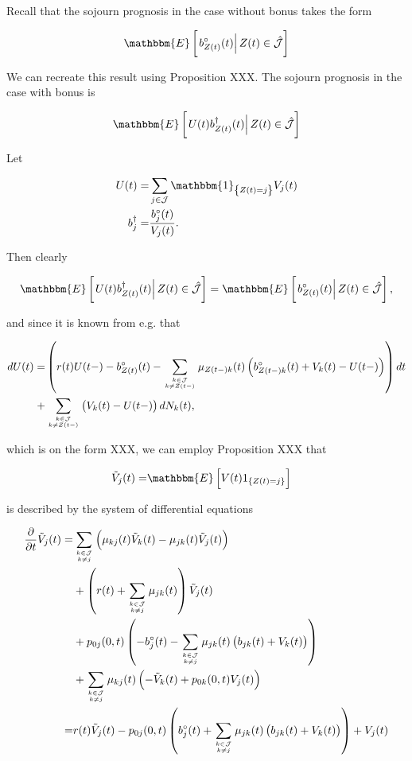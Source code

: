 \documentclass{book}
\newcommand{\1}[1]{\mathbbm{1}_{\left\lbrace #1 \right\rbrace}}
\newcommand{\expec}[1][def]{\mathbbm{E} \left[ #1 \right]}
\newcommand{\econd}[2][def]{\mathbbm{E} \left[ \left. #1 \right| #2 \right]}
\theoremstyle{break}
\theoremstyle{remark}
\newenvironment{remark}
  {\pushQED{\qed}\renewcommand{\qedsymbol}{\scalebox{1.4}{$\circ$}}\remarkx}
  {\popQED\endremarkx}
\numberwithin{equation}{section}
\begin{document}
\begin{remark}
	Recall that the sojourn prognosis in the case without bonus takes the form
	
	
	
	\begin{align}
	\econd[ b_{Z(t)}^\circ(t)]{Z(t) \in \hat{\mathcal{J}}}
	\end{align}
	
	We can recreate this result using Proposition XXX. The sojourn prognosis in the case with bonus is
	
	\begin{align}
	\econd[ U(t) b_{Z(t)}^\dagger(t)]{Z(t) \in \hat{\mathcal{J}}}
	\end{align}
	
	Let
	
	\begin{align*}
	U(t) =&  \sum_{j \in \mathcal{J}} \1{Z(t)=j} V_j(t) \\
	b_j^\dagger =& \frac{b_j^\circ(t)}{V_j(t)}.
	\end{align*}
	
	Then clearly
	
	\begin{align}
	\econd[ U(t) b_{Z(t)}^\dagger(t)]{Z(t) \in \hat{\mathcal{J}}} = \econd[ b_{Z(t)}^\circ(t)]{Z(t) \in \hat{\mathcal{J}}},
	\end{align}
	
	and since it is known from e.g. \cite{Liv2} that
	
	\begin{align*}
	dU(t) =& \left( r(t)U(t-) - b_{Z(t)}^\circ(t) - \sum_{k \in \mathcal{J} \atop k \neq Z(t-)} \mu_{Z(t-)k}(t) \left( b_{Z(t-)k}^\circ(t) + V_k(t) - U(t-) \right) \right) dt \\
	+& \sum_{k \in \mathcal{J} \atop k \neq Z(t-)} \left(V_k(t) - U(t-) \right) dN_k(t),
	\end{align*}
	
	which is on the form XXX, we can employ Proposition XXX that
	
	\begin{align*}
	\tilde{V}_j(t) =& \expec[ V(t) 1_{\{Z(t)=j\}} ]
	\end{align*}
	
	is described by the system of differential equations
	
	\begin{align*}
	\frac{\partial}{\partial t} \tilde{V}_j(t) =& \sum_{k \in \mathcal{J} \atop k \neq j} \left( \mu_{kj}(t) \tilde{V}_k(t) - \mu_{jk}(t) \tilde{V}_j(t) \right) \\
	&+ \left( r(t) + \sum_{k \in \mathcal{J} \atop k \neq j} \mu_{jk}(t) \right) \tilde{V}_j(t) \\
	&+ p_{0j}(0,t) \left( - b_j^\circ(t) - \sum_{k \in \mathcal{J} \atop k \neq j} \mu_{jk}(t) \left( b_{jk}(t) + V_k(t) \right) \right) \\
	&+ \sum_{k \in \mathcal{J} \atop k \neq j} \mu_{kj}(t) \left(
	-\tilde{V}_k(t) + p_{0k}(0,t) V_j(t) \right) \\
	=& r(t) \tilde{V}_j(t) - p_{0j}(0,t) \left( b_j^\circ(t) + \sum_{k \in \mathcal{J} \atop k \neq j} \mu_{jk}(t) \left( b_{jk}(t) + V_k(t) \right) \right) + V_j(t)
	\end{align*}
	

\end{remark}
\end{document}
